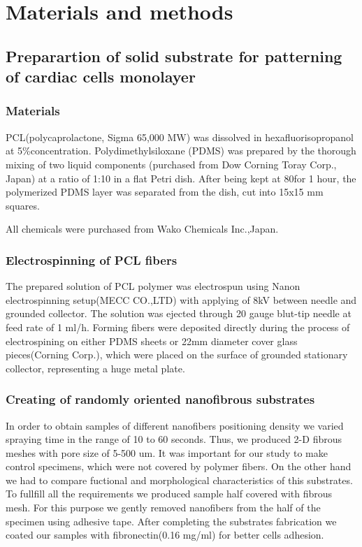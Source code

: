 \section{Materials and methods}
\label{sec:methods}

\subsection{Preparartion of solid substrate for patterning of cardiac cells monolayer}
\subsubsection{Materials}
	\label{sec:specimen_preparation_electrospinning}


PCL(polycaprolactone, Sigma 65,000 MW) was dissolved in hexafluorisopropanol at 5\%concentration.  
Polydimethylsiloxane (PDMS) was prepared by the thorough mixing of two liquid components (purchased from Dow Corning Toray Corp., Japan) at a ratio of 1:10 in a flat Petri dish. After being kept at 80\gc\space for 1 hour, the polymerized PDMS layer was separated from the dish, cut into 15x15 mm squares.

All chemicals were purchased from Wako Chemicals Inc.,Japan.
\subsubsection{Electrospinning of PCL fibers}
The prepared solution of PCL polymer was electrospun using Nanon electrospinning setup(MECC CO.,LTD) with applying of 8kV between needle and grounded collector. The solution was ejected through 20 gauge blut-tip needle at feed rate of 1 ml/h. Forming fibers were deposited directly during the process of electrospining on either PDMS sheets or 22mm diameter cover glass pieces(Corning Corp.), which were placed on the surface of grounded stationary collector, representing a huge metal plate.    
\subsubsection{Creating of randomly oriented nanofibrous substrates}
In order to obtain samples of different nanofibers positioning density we varied spraying time in the range of 10 to 60 seconds. Thus, we produced 2-D fibrous meshes with pore size of 5-500 um. 
It was important for our study to make control specimens, which were not covered by polymer fibers. On  the other hand we had to compare fuctional and morphological characteristics of this substrates. To fullfill all the requirements we produced sample half covered with fibrous mesh. For this purpose we gently removed nanofibers from the half of the specimen using adhesive tape. After completing the substrates fabrication we coated our samples with fibronectin(0.16 mg/ml) for better cells adhesion.
